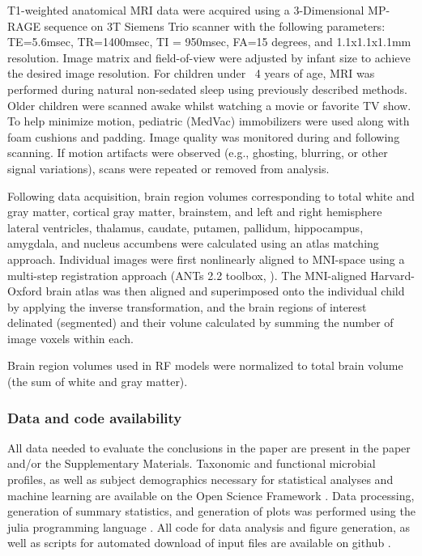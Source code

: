 \documentclass{article}
\begin{document}
T1-weighted anatomical MRI data were acquired using a 3-Dimensional MP-RAGE sequence
on 3T Siemens Trio scanner with the following parameters:
TE=5.6msec, TR=1400msec, TI = 950msec, FA=15 degrees, and 1.1x1.1x1.1mm resolution.
Image matrix and field-of-view were adjusted by infant size to achieve the desired image resolution.
For children under ~4 years of age, MRI was performed during natural non-sedated sleep using previously described methods\cite{deanPediatricNeuroimagingUsing2014}.
Older children were scanned awake whilst watching a movie or favorite TV show.
To help minimize motion, pediatric (MedVac) immobilizers were used along with foam cushions and padding.
Image quality was monitored during and following scanning.
If motion artifacts were observed (e.g., ghosting, blurring, or other signal variations), scans were repeated or removed from analysis.

Following data acquisition, brain region volumes corresponding to total white and gray matter,
cortical gray matter, brainstem, and left and right hemisphere lateral ventricles,
thalamus, caudate, putamen, pallidum, hippocampus, amygdala,
and nucleus accumbens were calculated using an atlas matching approach\cite{bruchhageLongitudinalBrainCognitive}.
Individual images were first nonlinearly aligned to MNI-space using
a multi-step registration approach (ANTs 2.2 toolbox, \cite{avantsInsightToolKitImage2014}).
The MNI-aligned Harvard-Oxford brain atlas was then aligned and superimposed onto the individual child
by applying the inverse transformation, and the brain regions of interest delinated (segmented)
and their volune calculated by summing the number of image voxels within each\cite{jenkinsonFSL2012}.

Brain region volumes used in RF models were normalized to total brain volume
(the sum of white and gray matter).

\subsubsection*{Data and code availability}

All data needed to evaluate the conclusions in the paper
are present in the paper and/or the Supplementary Materials.
Taxonomic and functional microbial profiles, as well as subject
demographics necessary for statistical analyses and machine learning are
available on the Open Science Framework
\cite{bonhamECHORESONANCEMicrobiome2022}.
Data processing, generation of summary statistics, and
generation of plots was performed using the julia programming language
\cite{bezansonJuliaFreshApproach2017,
    bonhamMicrobiomeJlBiobakeryUtils2021,
    danischMakieJlFlexible2021,
    blaomMLJJuliaPackage2020,
    ben_sadeghi_2022_7359268,
    dahua_lin_2023_7695673,
    douglas_bates_2023_7734970,
    douglas_bates_2023_7734970,
    kevin_bonham_2023_7647510}.
All code for data analysis and figure generation, as well as scripts for automated
download of input files are available on github \cite{kevin_bonham_2023_7647510}.
\end{document}

